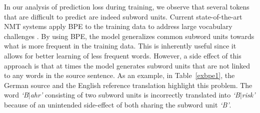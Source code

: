 In our analysis of prediction loss during training, we observe that several tokens that are difficult to predict are indeed subword units.
Current state-of-the-art NMT systems apply BPE to the training data to address large vocabulary challenges \citep{sennrich-haddow-birch:2016:P16-12}.
%
%
%
By using BPE, the model generalizes common subword units towards what is more frequent in the training data.
This is inherently useful since it allows for better learning of less frequent words.
However, a side effect of this approach is that at times the model generates subword units that are not linked to any words in the source sentence.
As an example, in Table~\ref{exbpe1}, the German source and the English reference translation highlight this problem.
The word \textit{`B$\mid$ahr'} consisting of two subword units is incorrectly translated into \textit{`B$\mid$risk'} because of an unintended side-effect of both sharing the subword unit \textit{`B'}.

